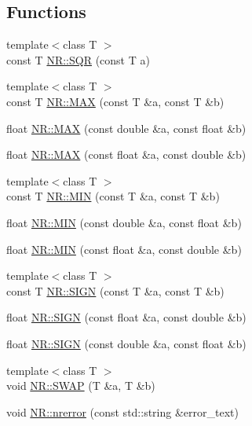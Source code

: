 \subsection*{Functions}
\begin{DoxyCompactItemize}
\item 
{\footnotesize template$<$class T $>$ }\\const T \mbox{\hyperlink{namespaceNR_a992bfd1c07cbd8f9fe94e42c055fd656}{N\+R\+::\+S\+QR}} (const T a)
\item 
{\footnotesize template$<$class T $>$ }\\const T \mbox{\hyperlink{namespaceNR_a92c68d40de4a9647ae9f24ec57c53b0e}{N\+R\+::\+M\+AX}} (const T \&a, const T \&b)
\item 
float \mbox{\hyperlink{namespaceNR_a1ccd7f766f5de91f30115cf7298019fa}{N\+R\+::\+M\+AX}} (const double \&a, const float \&b)
\item 
float \mbox{\hyperlink{namespaceNR_a77558a6eb41778af357e2b2fbc811eeb}{N\+R\+::\+M\+AX}} (const float \&a, const double \&b)
\item 
{\footnotesize template$<$class T $>$ }\\const T \mbox{\hyperlink{namespaceNR_a15f220f878bd3544d0d5b2036cf73835}{N\+R\+::\+M\+IN}} (const T \&a, const T \&b)
\item 
float \mbox{\hyperlink{namespaceNR_a5226e93da6f48d0d3702fa55e6c27052}{N\+R\+::\+M\+IN}} (const double \&a, const float \&b)
\item 
float \mbox{\hyperlink{namespaceNR_a73fa23c417e474fe668884249420b5d9}{N\+R\+::\+M\+IN}} (const float \&a, const double \&b)
\item 
{\footnotesize template$<$class T $>$ }\\const T \mbox{\hyperlink{namespaceNR_a7d16d361ddfe7454271c3a0a8050ece2}{N\+R\+::\+S\+I\+GN}} (const T \&a, const T \&b)
\item 
float \mbox{\hyperlink{namespaceNR_a5269afc715518376429b015036ff955c}{N\+R\+::\+S\+I\+GN}} (const float \&a, const double \&b)
\item 
float \mbox{\hyperlink{namespaceNR_a440c19c5d53c74535be8d59bc5b52a9f}{N\+R\+::\+S\+I\+GN}} (const double \&a, const float \&b)
\item 
{\footnotesize template$<$class T $>$ }\\void \mbox{\hyperlink{namespaceNR_af3d3d41b75c1e0ce80f32a6c45576db3}{N\+R\+::\+S\+W\+AP}} (T \&a, T \&b)
\item 
void \mbox{\hyperlink{namespaceNR_a61ef7c1cda6052203b5b115ef38e51da}{N\+R\+::nrerror}} (const std\+::string \&error\+\_\+text)

\end{DoxyCompactItemize}
